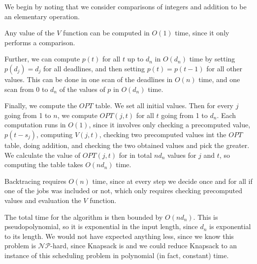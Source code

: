 \documentclass{article}
\begin{document}
We begin by noting that we consider comparisons of integers and addition to be an elementary operation.

Any value of the $V$ function can be computed in $O(1)$ time, since it only performs a comparison.

Further, we can compute $p(t)$ for all $t$ up to $d_n$ in $O(d_n)$ time by setting $p(d_j) = d_j$ for all deadlines, and then setting $p(t) = p(t-1)$ for all other values. This can be done in one scan of the deadlines in $O(n)$ time, and one scan from 0 to $d_n$ of the values of $p$ in $O(d_n)$ time.

Finally, we compute the $OPT$ table. We set all initial values. Then for every $j$ going from 1 to $n$, we compute $OPT(j, t)$ for all $t$ going from 1 to $d_n$. Each computation runs in $O(1)$, since it involves only checking a precomputed value, $p(t-s_j)$, computing $V(j,t)$, checking two precomputed values int the $OPT$ table, doing addition, and checking the two obtained values and pick the greater. We calculate the value of $OPT(j,t)$ for in total $n d_n$ values for $j$ and $t$, so computing the table takes $O(n d_n)$ time.

Backtracing requires $O(n)$ time, since at every step we decide once and for all if one of the jobs was included or not, which  only requires checking precomputed values and evaluation the $V$ function.

The total time for the algorithm is then bounded by $O(n d_n)$. This is pseudopolynomial, so it is exponential in the input length, since $d_n$ is exponential to its length. We would not have expected anything less, since we know this problem is $\mathcal{NP}$-hard, since Knapsack is and we could reduce Knapsack to an instance of this scheduling problem in polynomial (in fact, constant) time.
\end{document}
